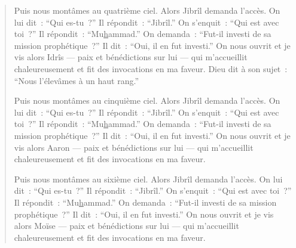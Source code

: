 \begin{quote}
Puis nous montâmes au quatrième ciel. Alors Jibrîl demanda l'accès. On
lui dit~: ``Qui es-tu~?'' Il répondit~: ``Jibrîl.'' On s'enquit~: ``Qui
est avec toi~?'' Il répondit~: ``Mu\underline{h}ammad.'' On demanda~:
``Fut-il investi de sa mission prophétique~?'' Il dit~: ``Oui, il en fut
investi.'' On nous ouvrit et je vis alors Idrîs --- paix et bénédictions
sur lui --- qui m'accueillit chaleureusement et fit des invocations en
ma faveur. Dieu dit à son sujet~: ``Nous l'élevâmes à un haut rang.''

Puis nous montâmes au cinquième ciel. Alors Jibrîl demanda l'accès. On
lui dit~: ``Qui es-tu~?'' Il répondit~: ``Jibrîl.'' On s'enquit~: ``Qui
est avec toi~?'' Il répondit~: ``Mu\underline{h}ammad.'' On demanda~:
``Fut-il investi de sa mission prophétique~?'' Il dit~: ``Oui, il en fut
investi.'' On nous ouvrit et je vis alors Aaron --- paix et bénédictions
sur lui --- qui m'accueillit chaleureusement et fit des invocations en
ma faveur.

Puis nous montâmes au sixième ciel. Alors Jibrîl demanda l'accès. On lui
dit~: ``Qui es-tu~?'' Il répondit~: ``Jibrîl.'' On s'enquit~: ``Qui est
avec toi~?'' Il répondit~: ``Mu\underline{h}ammad.'' On demanda~:
``Fut-il investi de sa mission prophétique~?'' Il dit~: ``Oui, il en fut
investi.'' On nous ouvrit et je vis alors Moïse --- paix et bénédictions
sur lui --- qui m'accueillit chaleureusement et fit des invocations en
ma faveur.


\end{quote}
